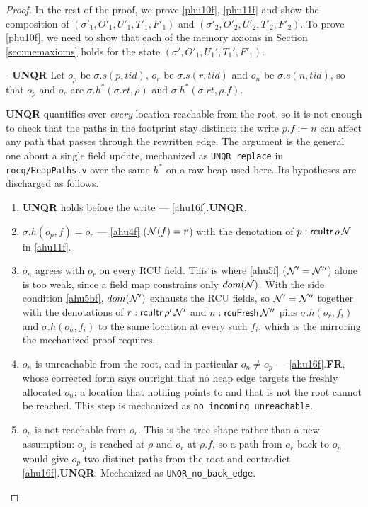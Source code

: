 \begin{proof}
In the rest of the proof, we prove \ref{phu10f}, \ref{phu11f} and show the composition of $(\sigma'_1, O'_1, U'_1,T'_1,F'_1)$ and  $(\sigma'_2, O'_2, U'_2,T'_2,F'_2)$. To prove \ref{phu10f}, we need to show that each of the memory axioms in Section \ref{sec:memaxioms} holds for the state $(\sigma',O'_1,U_1',T_1',F'_1)$.

\begin{case}\label{unqrf} - \textbf{UNQR}
Let $o_p$ be $\sigma.s(p,tid)$, $o_r$ be $\sigma.s(r,tid)$ and $o_n$ be
$\sigma.s(n,tid)$, so that $o_p$ and $o_r$ are $\sigma.h^{*}(\sigma.rt,\rho)$ and
$\sigma.h^{*}(\sigma.rt,\rho.f)$.

\textbf{UNQR} quantifies over \emph{every} location reachable from the root, so it
is not enough to check that the paths in the footprint stay distinct: the write
$p.f := n$ can affect any path that passes through the rewritten edge.  The
argument is the general one about a single field update, mechanized as
\texttt{UNQR\_replace} in \texttt{rocq/HeapPaths.v} over the same $h^{*}$ on a raw
heap used here.  Its hypotheses are discharged as follows.

\begin{enumerate}
\item \textbf{UNQR} holds before the write --- \ref{ahu16f}.\textbf{UNQR}.
\item $\sigma.h(o_p,f) = o_r$ --- \ref{ahu4f} ($\mathcal{N}(f) = r$) with the denotation of
  $p:\textsf{rcuItr}\,\rho\,\mathcal{N}$ in \ref{ahu11f}.
\item $o_n$ agrees with $o_r$ on every \textsf{RCU} field.  This is where
  \ref{ahu5f} ($\mathcal{N}' = \mathcal{N}''$) alone is too weak, since a field map constrains only
  $dom(\mathcal{N})$.  With the side condition \ref{ahu5bf}, $dom(\mathcal{N}')$ exhausts the
  \textsf{RCU} fields, so $\mathcal{N}' = \mathcal{N}''$ together with the denotations of
  $r:\textsf{rcuItr}\,\rho'\,\mathcal{N}'$ and $n:\textsf{rcuFresh}\,\mathcal{N}''$ pins
  $\sigma.h(o_r,f_i)$ and $\sigma.h(o_n,f_i)$ to the same location at every such
  $f_i$, which is the mirroring the mechanized proof requires.
\item $o_n$ is unreachable from the root, and in particular $o_n \neq o_p$ ---
  \ref{ahu16f}.\textbf{FR}, whose corrected form says outright that no heap edge
  targets the freshly allocated $o_n$; a location that nothing points to and that
  is not the root cannot be reached.  This step is mechanized as
  \texttt{no\_incoming\_unreachable}.
\item $o_p$ is not reachable from $o_r$.  This is the tree shape rather than a new
  assumption: $o_p$ is reached at $\rho$ and $o_r$ at $\rho.f$, so a path from
  $o_r$ back to $o_p$ would give $o_p$ two distinct paths from the root and
  contradict \ref{ahu16f}.\textbf{UNQR}.  Mechanized as
  \texttt{UNQR\_no\_back\_edge}.
\end{enumerate}


\end{case}
\end{proof}
